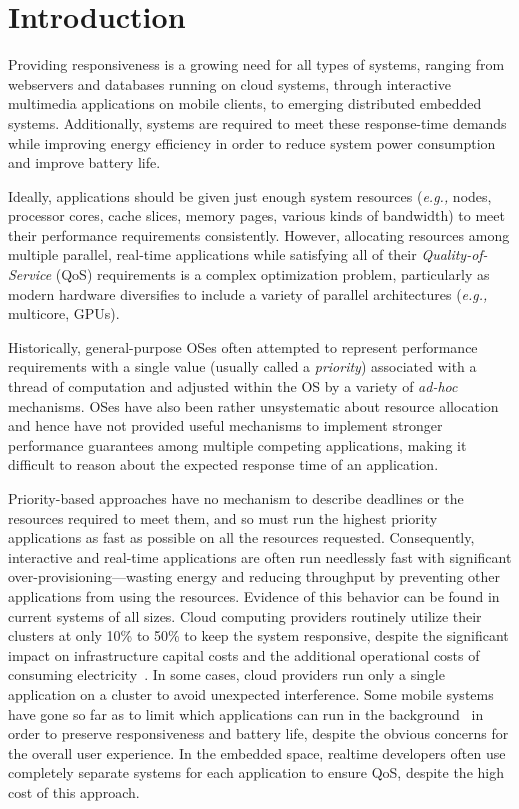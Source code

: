 \chapter{Introduction}

Providing responsiveness is a growing need for all types of systems,
ranging from webservers and databases running on cloud systems,
through interactive multimedia applications on mobile clients, to
emerging distributed embedded systems. Additionally, systems are
required to meet these response-time demands while improving energy
efficiency in order to reduce system power consumption and improve battery
life.

Ideally, applications should be given just enough system resources
(\emph{e.g.,} nodes, processor cores, cache slices, memory pages,
various kinds of bandwidth) to meet their performance requirements
consistently.  However, allocating resources among multiple parallel,
real-time applications while satisfying all of their
\emph{Quality-of-Service} (QoS) requirements is a complex optimization
problem, particularly as modern hardware diversifies to include a
variety of parallel architectures (\emph{e.g.,} multicore, GPUs).

Historically, general-purpose OSes often attempted to represent performance
requirements with a single value (usually called a \emph{priority})
associated with a thread of computation and adjusted within the OS by
a variety of \emph{ad-hoc} mechanisms.  OSes have also been rather
unsystematic about resource allocation and hence have not provided
useful mechanisms to implement stronger performance guarantees among
multiple competing applications, making it difficult to reason about
the expected response time of an application.

Priority-based approaches have no mechanism to describe deadlines or
the resources required to meet them, and so must run the highest
priority applications as fast as possible on all the resources
requested.  Consequently, interactive and real-time applications are
often run needlessly fast with significant over-provisioning---wasting energy and reducing throughput by preventing other
applications from using the resources.  Evidence of this behavior can
be found in current systems of all sizes.  Cloud computing providers
routinely utilize their clusters at only 10\% to 50\% to keep the
system responsive, despite the significant impact on infrastructure
capital costs and the additional operational costs of consuming
electricity~\cite{Barroso2009,Hennessy2011}.  In some cases, cloud
providers run only a single application on a cluster to avoid
unexpected interference.  Some mobile systems have gone so far as to
limit which applications can run in the background~\cite{iOsDev} in
order to preserve responsiveness and battery life, despite the obvious
concerns for the overall user experience.  In the embedded space,
realtime developers often use completely separate systems for each
application to ensure QoS, despite the high cost of this approach.

